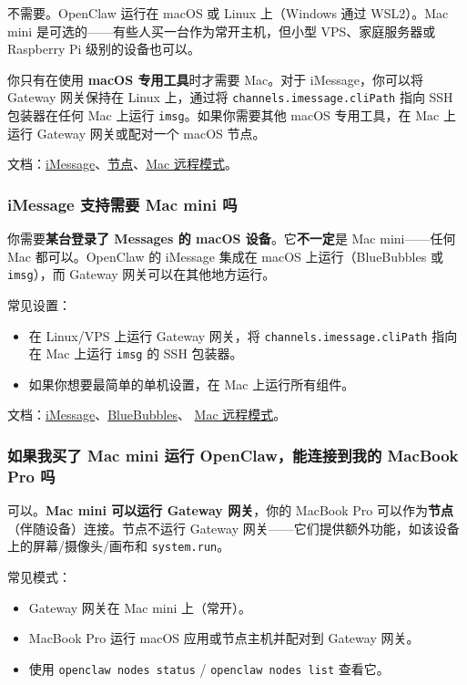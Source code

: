 不需要。OpenClaw 运行在 macOS 或 Linux 上（Windows 通过 WSL2）。Mac mini 是可选的——有些人买一台作为常开主机，但小型 VPS、家庭服务器或 Raspberry Pi 级别的设备也可以。

你只有在使用 \textbf{macOS 专用工具}时才需要 Mac。对于 iMessage，你可以将 Gateway 网关保持在 Linux 上，通过将 \texttt{channels.imessage.cliPath} 指向 SSH 包装器在任何 Mac 上运行 \texttt{imsg}。如果你需要其他 macOS 专用工具，在 Mac 上运行 Gateway 网关或配对一个 macOS 节点。

文档：\href{/channels/imessage}{iMessage}、\href{/nodes}{节点}、\href{/platforms/mac/remote}{Mac 远程模式}。

\subsubsection{iMessage 支持需要 Mac mini 吗}


你需要\textbf{某台登录了 Messages 的 macOS 设备}。它\textbf{不一定}是 Mac mini——任何 Mac 都可以。OpenClaw 的 iMessage 集成在 macOS 上运行（BlueBubbles 或 \texttt{imsg}），而 Gateway 网关可以在其他地方运行。

常见设置：

\begin{itemize}
  \item 在 Linux/VPS 上运行 Gateway 网关，将 \texttt{channels.imessage.cliPath} 指向在 Mac 上运行 \texttt{imsg} 的 SSH 包装器。
  \item 如果你想要最简单的单机设置，在 Mac 上运行所有组件。
\end{itemize}


文档：\href{/channels/imessage}{iMessage}、\href{/channels/bluebubbles}{BlueBubbles}、
\href{/platforms/mac/remote}{Mac 远程模式}。

\subsubsection{如果我买了 Mac mini 运行 OpenClaw，能连接到我的 MacBook Pro 吗}


可以。\textbf{Mac mini 可以运行 Gateway 网关}，你的 MacBook Pro 可以作为\textbf{节点}（伴随设备）连接。节点不运行 Gateway 网关——它们提供额外功能，如该设备上的屏幕/摄像头/画布和 \texttt{system.run}。

常见模式：

\begin{itemize}
  \item Gateway 网关在 Mac mini 上（常开）。
  \item MacBook Pro 运行 macOS 应用或节点主机并配对到 Gateway 网关。
  \item 使用 \texttt{openclaw nodes status} / \texttt{openclaw nodes list} 查看它。
\end{itemize}


